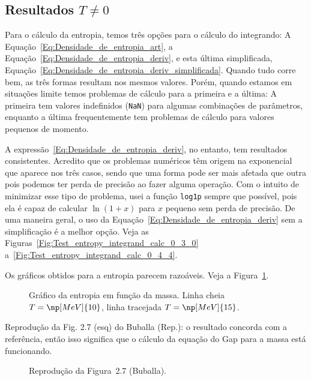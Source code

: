 \subsection{Resultados $T \neq 0$}

Para o cálculo da entropia, temos três opções para o cálculo do integrando: A Equação~\eqref{Eq:Densidade_de_entropia_art}, a Equação~\eqref{Eq:Densidade_de_entropia_deriv}, e esta última simplificada, Equação~\eqref{Eq:Densidade_de_entropia_deriv_simplificada}. Quando tudo corre bem, as três formas resultam nos mesmos valores. Porém, quando estamos em situações limite temos problemas de cálculo para a primeira e a última: A primeira tem valores indefinidos (\texttt{NaN}) para algumas combinações de parâmetros, enquanto a última frequentemente tem problemas de cálculo para valores pequenos de momento.

A expressão~\eqref{Eq:Densidade_de_entropia_deriv}, no entanto, tem resultados consistentes. Acredito que os problemas numéricos têm origem na exponencial que aparece nos três casos, sendo que uma forma pode ser mais afetada que outra pois podemos ter perda de precisão ao fazer alguma operação. Com o intuito de minimizar esse tipo de problema, usei a função \texttt{log1p} sempre que possível, pois ela é capaz de calcular $\ln(1 + x)$ para $x$ pequeno sem perda de precisão. De uma maneira geral, o uso da Equação~\eqref{Eq:Densidade_de_entropia_deriv} sem a simplificação é a melhor opção. Veja as Figuras~\ref{Fig:Test_entropy_integrand_calc_0_3_0} a~\ref{Fig:Test_entropy_integrand_calc_0_4_4}.

Os gráficos obtidos para a entropia parecem razoáveis. Veja a Figura~\ref{Fig:Entropia}.

\begin{figure}
	
	\caption{Gráfico da entropia em função da massa. Linha cheia $T = \np[MeV]{10}$, linha tracejada $T = \np[MeV]{15}$. \protect}
	\label{Fig:Entropia}
\end{figure}

Reprodução da Fig. 2.7 (esq) do Buballa (Rep.): o resultado concorda com a referência, então isso significa que o cálculo da equação do Gap para a massa está funcionando.
\begin{figure}
	
	\caption{Reprodução da Figura~2.7 (Buballa). \protect}
	\label{Fig:Buballa_rep_2.7}
\end{figure}


